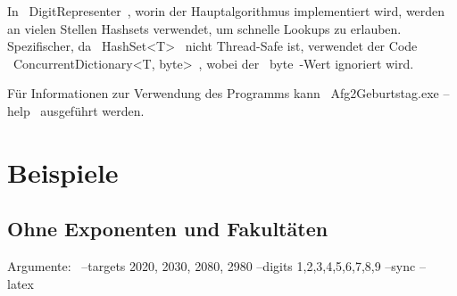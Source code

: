 \documentclass{article}
\theoremstyle{nonumberplain}
\begin{document}
In ~DigitRepresenter~, worin der Hauptalgorithmus implementiert wird, werden an vielen Stellen Hashsets verwendet, um schnelle Lookups zu erlauben.
Spezifischer, da ~HashSet<T>~ nicht Thread-Safe ist, verwendet der Code ~ConcurrentDictionary<T, byte>~, wobei der ~byte~-Wert ignoriert wird.

Für Informationen zur Verwendung des Programms kann ~Afg2Geburtstag.exe --help~ ausgeführt werden.

\section{Beispiele}

\subsection{Ohne Exponenten und Fakultäten}

Argumente:
~--targets 2020, 2030, 2080, 2980 --digits 1,2,3,4,5,6,7,8,9 --sync --latex~
\end{document}
